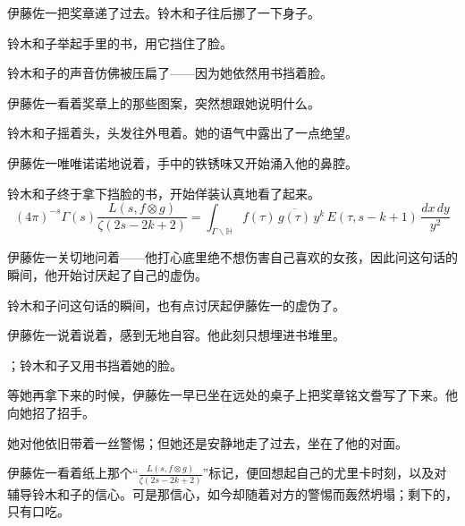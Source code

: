 
伊藤佐一把奖章递了过去。铃木和子往后挪了一下身子。


铃木和子举起手里的书，用它挡住了脸。


铃木和子的声音仿佛被压扁了——因为她依然用书挡着脸。

伊藤佐一看着奖章上的那些图案，突然想跟她说明什么。


铃木和子摇着头，头发往外甩着。她的语气中露出了一点绝望。

伊藤佐一唯唯诺诺地说着，手中的铁锈味又开始涌入他的鼻腔。

铃木和子终于拿下挡脸的书，开始佯装认真地看了起来。
\begin{equation*}
    \label{eq:placeholder_label}
    (4\pi)^{-s} \Gamma(s) \frac{L(s,f \otimes g)}{\zeta(2s-2k+2)}
    =\int_{\Gamma \backslash \mathbb{H}} f(\tau)\,\overline{g(\tau)}\,y^{k}\,E(\tau,s-k+1)\,\frac{dx\,dy}{y^{2}}
\end{equation*}

伊藤佐一关切地问着——他打心底里绝不想伤害自己喜欢的女孩，因此问这句话的瞬间，他开始讨厌起了自己的虚伪。

铃木和子问这句话的瞬间，也有点讨厌起伊藤佐一的虚伪了。

伊藤佐一说着说着，感到无地自容。他此刻只想埋进书堆里。

；铃木和子又用书挡着她的脸。

等她再拿下来的时候，伊藤佐一早已坐在远处的桌子上把奖章铭文誊写了下来。他向她招了招手。

她对他依旧带着一丝警惕；但她还是安静地走了过去，坐在了他的对面。

伊藤佐一看着纸上那个“\(\frac{L(s,f \otimes g)}{\zeta(2s-2k+2)}\)”标记，便回想起自己的尤里卡时刻，以及对辅导铃木和子的信心。可是那信心，如今却随着对方的警惕而轰然坍塌；剩下的，只有口吃。


